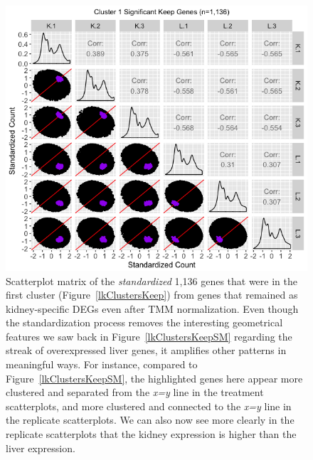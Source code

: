 \documentclass[11pt,a4paper,oldfontcommands,openany]{memoir}
\numberwithin{equation}{section} %
\begin{document}
\null
\begin{figure}[t!]
\begin{framed}
\centerline{\includegraphics[width=1\columnwidth]{MakeFigures/lkClustersKeepSM-St.jpg}}
\end{framed}
\caption{Scatterplot matrix of the \textit{standardized} 1,136 genes that were in the first cluster (Figure~\ref{lkClustersKeep}) from genes that remained as kidney-specific DEGs even after TMM normalization. Even though the standardization process removes the interesting geometrical features we saw back in Figure~\ref{lkClustersKeepSM} regarding the streak of overexpressed liver genes, it amplifies other patterns in meaningful ways. For instance, compared to Figure~\ref{lkClustersKeepSM}, the highlighted genes here appear more clustered and separated from the \textit{x=y} line in the treatment scatterplots, and more clustered and connected to the \textit{x=y} line in the replicate scatterplots. We can also now see more clearly in the replicate scatterplots that the kidney expression is higher than the liver expression.
\label{lkClustersKeepSM-St}}
\end{figure}
\end{document}
